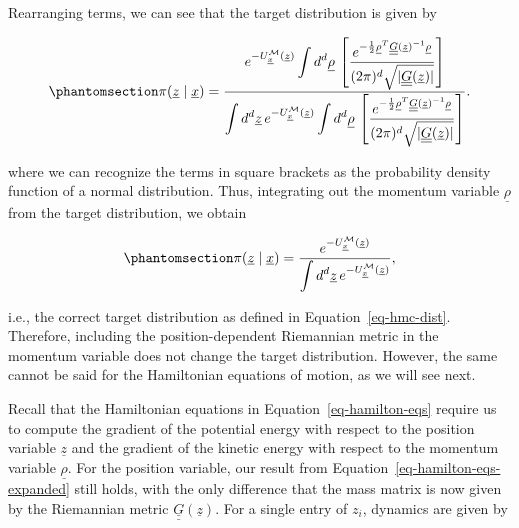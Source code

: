 \documentclass[
]{scrartcl}
\begin{document}
\begin{refsection}
Rearranging terms, we can see that the target distribution is given by

\begin{equation}\phantomsection\label{eq-target-rhmc-expanded}{
\pi(\underline{z} \mid \underline{x}) = 
\frac{
    e^{-U_{\underline{x}}^{\mathcal{M}}(\underline{z})} 
    \displaystyle\int d^d\underline{\rho} \, 
    \left[ 
        \frac{
            e^{-\frac{1}{2} 
            \underline{\rho}^T 
            \underline{\underline{G}}(\underline{z})^{-1} 
            \underline{\rho}}
        }{
            (2\pi)^d \sqrt{|\underline{\underline{G}}(\underline{z})|}
        } 
    \right]
}
{
    \displaystyle\int d^d\underline{z} \, 
    e^{-U_{\underline{x}}^{\mathcal{M}}(\underline{z})} 
    \displaystyle\int d^d\underline{\rho} \, 
    \left[ 
        \frac{
            e^{
                -\frac{1}{2}
                \underline{\rho}^T
                \underline{\underline{G}}(\underline{z})^{-1} 
                \underline{\rho}
            }
        }{
            (2\pi)^d \sqrt{|\underline{\underline{G}}(\underline{z})|}
        } 
    \right]
}.
}\end{equation}

where we can recognize the terms in square brackets as the probability
density function of a normal distribution. Thus, integrating out the
momentum variable \(\underline{\rho}\) from the target distribution, we
obtain

\begin{equation}\phantomsection\label{eq-target-rhmc-marginal}{
\pi(\underline{z} \mid \underline{x}) = 
\frac{e^{-U_{\underline{x}}^{\mathcal{M}}(\underline{z})}}
{
    \displaystyle\int d^d\underline{z} \, 
    e^{-U_{\underline{x}}^{\mathcal{M}}(\underline{z})}
},
}\end{equation}

i.e., the correct target distribution as defined in
Equation~\ref{eq-hmc-dist}. Therefore, including the position-dependent
Riemannian metric in the momentum variable does not change the target
distribution. However, the same cannot be said for the Hamiltonian
equations of motion, as we will see next.

Recall that the Hamiltonian equations in Equation~\ref{eq-hamilton-eqs}
require us to compute the gradient of the potential energy with respect
to the position variable \(\underline{z}\) and the gradient of the
kinetic energy with respect to the momentum variable
\(\underline{\rho}\). For the position variable, our result from
Equation~\ref{eq-hamilton-eqs-expanded} still holds, with the only
difference that the mass matrix is now given by the Riemannian metric
\(\underline{\underline{G}}(\underline{z})\). For a single entry of
\(z_i\), dynamics are given by


\end{refsection}
\end{document}
